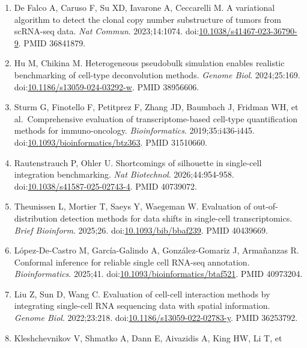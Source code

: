 \documentclass{article}
\begin{document}
\begin{enumerate}
  Han S, Xiong Z, Zhou Y, Yang C. Benchmarking copy number alteration
  inference methods for spatial transcriptomics. \emph{Nat Commun}.
  2026;17:10565.
  doi:\href{https://doi.org/10.1038/s41467-026-77500-5}{10.1038/s41467-026-77500-5}.
  PMID 42838986.
\item
  De Falco A, Caruso F, Su XD, Iavarone A, Ceccarelli M. A variational
  algorithm to detect the clonal copy number substructure of tumors from
  scRNA-seq data. \emph{Nat Commun}. 2023;14:1074.
  doi:\href{https://doi.org/10.1038/s41467-023-36790-9}{10.1038/s41467-023-36790-9}.
  PMID 36841879.
\item
  Hu M, Chikina M. Heterogeneous pseudobulk simulation enables realistic
  benchmarking of cell-type deconvolution methods. \emph{Genome Biol}.
  2024;25:169.
  doi:\href{https://doi.org/10.1186/s13059-024-03292-w}{10.1186/s13059-024-03292-w}.
  PMID 38956606.
\item
  Sturm G, Finotello F, Petitprez F, Zhang JD, Baumbach J, Fridman WH,
  et al.~Comprehensive evaluation of transcriptome-based cell-type
  quantification methods for immuno-oncology. \emph{Bioinformatics}.
  2019;35:i436-i445.
  doi:\href{https://doi.org/10.1093/bioinformatics/btz363}{10.1093/bioinformatics/btz363}.
  PMID 31510660.
\item
  Rautenstrauch P, Ohler U. Shortcomings of silhouette in single-cell
  integration benchmarking. \emph{Nat Biotechnol}. 2026;44:954-958.
  doi:\href{https://doi.org/10.1038/s41587-025-02743-4}{10.1038/s41587-025-02743-4}.
  PMID 40739072.
\item
  Theunissen L, Mortier T, Saeys Y, Waegeman W. Evaluation of
  out-of-distribution detection methods for data shifts in single-cell
  transcriptomics. \emph{Brief Bioinform}. 2025;26.
  doi:\href{https://doi.org/10.1093/bib/bbaf239}{10.1093/bib/bbaf239}.
  PMID 40439669.
\item
  López-De-Castro M, García-Galindo A, González-Gomariz J, Armañanzas R.
  Conformal inference for reliable single cell RNA-seq annotation.
  \emph{Bioinformatics}. 2025;41.
  doi:\href{https://doi.org/10.1093/bioinformatics/btaf521}{10.1093/bioinformatics/btaf521}.
  PMID 40973204.
\item
  Liu Z, Sun D, Wang C. Evaluation of cell-cell interaction methods by
  integrating single-cell RNA sequencing data with spatial information.
  \emph{Genome Biol}. 2022;23:218.
  doi:\href{https://doi.org/10.1186/s13059-022-02783-y}{10.1186/s13059-022-02783-y}.
  PMID 36253792.
\item
  Kleshchevnikov V, Shmatko A, Dann E, Aivazidis A, King HW, Li T, et

\end{enumerate}
\end{document}
